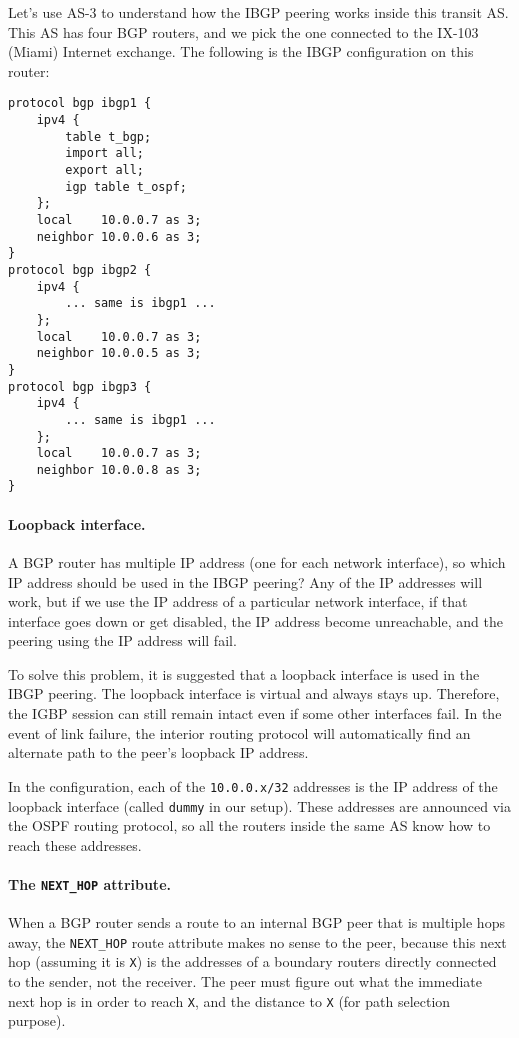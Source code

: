 Let's use AS-3 to understand how the IBGP peering works inside 
this transit AS. 
This AS has four BGP routers, and we pick the one 
connected to the IX-103 (Miami) Internet exchange.
The following is the IBGP configuration on this router:

\begin{lstlisting}
protocol bgp ibgp1 {
    ipv4 {
        table t_bgp;
        import all;
        export all;
        igp table t_ospf;
    };
    local    10.0.0.7 as 3;
    neighbor 10.0.0.6 as 3;
}
protocol bgp ibgp2 {
    ipv4 {
        ... same is ibgp1 ...
    };
    local    10.0.0.7 as 3;
    neighbor 10.0.0.5 as 3;
}
protocol bgp ibgp3 {
    ipv4 {
        ... same is ibgp1 ...
    };
    local    10.0.0.7 as 3;
    neighbor 10.0.0.8 as 3;
}
\end{lstlisting}


\paragraph{Loopback interface.}
A BGP router has multiple IP address (one for each network interface), so which IP address
should be used in the IBGP peering? Any of the IP addresses will work, but 
if we use the IP address of a particular network interface, if that interface 
goes down or get disabled, the IP address become unreachable, and the 
peering using the IP address will fail. 

To solve this problem, it is suggested that a loopback interface is used 
in the IBGP peering. The loopback interface is virtual and always stays up. 
Therefore, the IGBP session can still remain intact even if some other 
interfaces fail. In the event of link failure, the interior routing 
protocol will automatically find an alternate path to the peer's loopback
IP address. 

In the configuration, each of the \texttt{10.0.0.x/32} addresses is 
the IP address of the loopback interface (called \texttt{dummy} in our setup). 
These addresses are announced via the OSPF routing protocol, so all the 
routers inside the same AS know how to reach these addresses. 



\paragraph{The \texttt{NEXT\_HOP} attribute.}
When a BGP router sends a route to an internal BGP peer that is multiple hops
away, the \texttt{NEXT\_HOP} route attribute makes no sense to the peer, 
because this next hop (assuming it is \texttt{X}) is the addresses of a 
boundary routers directly connected to the sender, not the receiver. 
The peer must figure out what the immediate next hop is in order to reach \texttt{X}, 
and the distance to \texttt{X} (for path selection purpose). 

